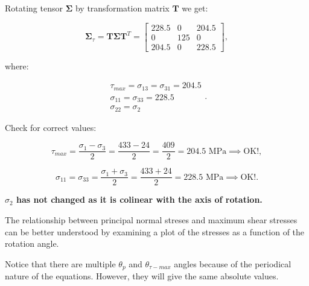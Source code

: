 \begin{itemize}
        Rotating tensor $\mathbf{\Sigma}$ by transformation matrix $\mathbf{T}$ we get:

        \begin{equation}
            \mathbf{\Sigma}_{\tau} = \mathbf{T}\mathbf{\Sigma}\mathbf{T}^{T}
            = \begin{bmatrix}
                228.5 & 0 & 204.5 \\
                0 & 125 & 0 \\
                204.5 & 0 & 228.5
            \end{bmatrix}
        ,\end{equation}

        where:

        \begin{equation}
            \begin{array}{l}
                \tau_{max} = \sigma_{13} = \sigma_{31} = 204.5 \\
                \sigma_{11} = \sigma_{33} = 228.5 \\
                \sigma_{22} = \sigma_2
            \end{array}
        .\end{equation}

        Check for correct values:

        \begin{equation}
            \tau_{max} = \frac{\sigma_1 - \sigma_3}{2} = \frac{433 - 24}{2}
            = \frac{409}{2} = 204.5 \text{ MPa} \implies \text{OK!}
        ,\end{equation}

        \begin{equation}
            \sigma_{11} = \sigma_{33} = \frac{\sigma_1 + \sigma_3}{2}
            = \frac{433 + 24}{2} = 228.5 \text{ MPa} \implies \text{OK!}
        .\end{equation}

        \textbf{$\sigma_2$ has not changed as it is colinear with the axis of rotation.}

        The relationship between principal normal streses and maximum shear stresses
        can be better understood by examining a plot of the stresses as a function
        of the rotation angle.

        Notice that there are multiple $\theta_{p}$ and $\theta_{\tau - max}$
        angles because of the periodical nature of the equations. However, they
        will give the same absolute values.


\end{itemize}

